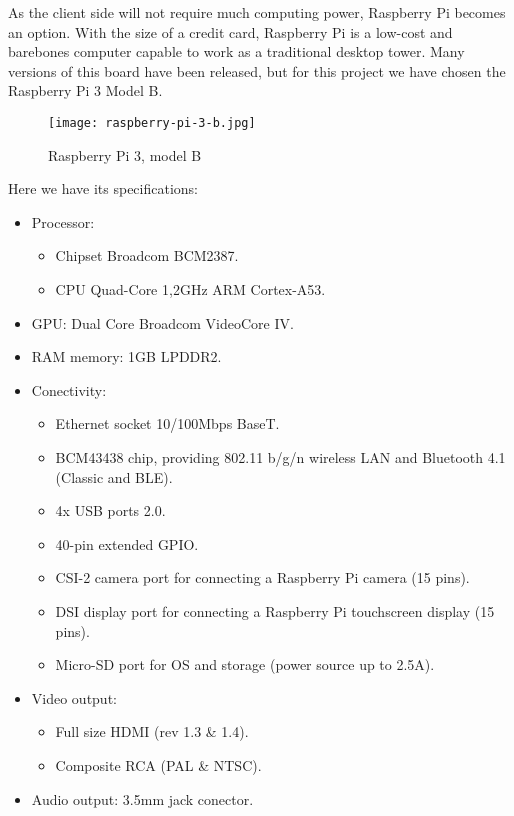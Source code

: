 	As the client side will not require much computing power, Raspberry Pi becomes an option. With the size of a credit card, Raspberry Pi is a low-cost and barebones computer capable to work as a traditional desktop tower. Many versions of this board have been released, but for this project we have chosen the Raspberry Pi 3 Model B.

	\begin{figure}[ht]
		\centering
		\texttt{[image: raspberry-pi-3-b.jpg]}
		\caption{Raspberry Pi 3, model B}
	\end{figure}

	Here we have its specifications:

	\begin{itemize}
		\item Processor:
			\begin{itemize}
				\item Chipset Broadcom BCM2387.
				\item CPU Quad-Core 1,2GHz ARM Cortex-A53.
			\end{itemize}
		\item GPU: Dual Core Broadcom VideoCore IV.
		\item RAM memory: 1GB LPDDR2.
		\item Conectivity:
			\begin{itemize}
				\item Ethernet socket 10/100Mbps BaseT.
				\item BCM43438 chip, providing 802.11 b/g/n wireless LAN and Bluetooth 4.1 (Classic and BLE).
				\item 4x USB ports 2.0.
				\item 40-pin extended GPIO.
				\item CSI-2 camera port for connecting a Raspberry Pi camera (15 pins).
				\item DSI display port for connecting a Raspberry Pi touchscreen display (15 pins).
				\item Micro-SD port for OS and storage (power source up to 2.5A).
			\end{itemize}
		\item Video output:
			\begin{itemize}
				\item Full size HDMI (rev 1.3 \& 1.4).
				\item Composite RCA (PAL \& NTSC).
			\end{itemize}
		\item Audio output: 3.5mm jack conector.
	\end{itemize}

